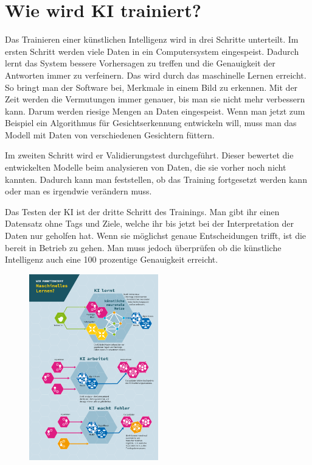 \documentclass{report}
\begin{document}
\section{Wie wird KI trainiert?}

Das Trainieren einer künstlichen Intelligenz wird in drei Schritte unterteilt. Im ersten Schritt werden viele Daten in ein Computersystem eingespeist. Dadurch lernt das System bessere Vorhersagen zu treffen und die Genauigkeit der Antworten immer zu verfeinern. Das wird durch das maschinelle Lernen erreicht. So bringt man der Software bei, Merkmale in einem Bild zu erkennen. Mit der Zeit werden die Vermutungen immer genauer, bis man sie nicht mehr verbessern kann. Darum werden riesige Mengen an Daten eingespeist. Wenn man jetzt zum Beispiel ein Algorithmus für Gesichtserkennung entwickeln will, muss man das Modell mit Daten von verschiedenen Gesichtern füttern. 

\vspace{2mm}Im zweiten Schritt wird er Validierungstest durchgeführt. Dieser bewertet die entwickelten Modelle beim analysieren von Daten, die sie vorher noch nicht kannten. Dadurch kann man feststellen, ob das Training fortgesetzt werden kann oder man es irgendwie verändern muss. 

\vspace{2mm}Das Testen der KI ist der dritte Schritt des Trainings. Man gibt ihr einen Datensatz ohne Tags und Ziele, welche ihr bis jetzt bei der Interpretation der Daten nur geholfen hat. Wenn sie möglichst genaue Entscheidungen trifft, ist die bereit in Betrieb zu gehen. Man muss jedoch überprüfen ob die künstliche Intelligenz auch eine 100 prozentige Genauigkeit erreicht.

\begin{figure}[h]
    \centering
    \includegraphics[width=0.5\textwidth]{training.png}
    \end{figure}
\end{document}
